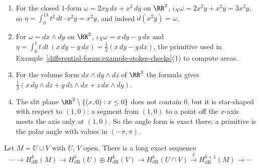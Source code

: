 \begin{example}\label{de-rham:example-explicit-primitives}
\begin{enumerate}
\item For the closed $1$-form $\omega = 2xy\,dx + x^2\,dy$ on $\RR^2$, $\iota_X\omega = 2x^2y + x^2y = 3x^2y$, so $\eta = \int_0^13t^2\,dt \cdot x^2y = x^2y$, and indeed $d(x^2y) = \omega$.
\item For $\omega = dx \wedge dy$ on $\RR^2$, $\iota_X\omega = x\,dy - y\,dx$ and $\eta = \int_0^1t\,dt\,(x\,dy - y\,dx) = \frac12(x\,dy - y\,dx)$, the primitive used in
Example~\ref{differential-forms:example-stokes-checks}(1) to compute areas.
\item For the volume form $dx \wedge dy \wedge dz$ of $\RR^3$ the formula gives $\frac13(x\,dy \wedge dz + y\,dz \wedge dx + z\,dx \wedge dy)$.
\item The slit plane $\RR^2 \setminus \{(x, 0) : x \leq 0\}$ does not contain $0$, but it is star-shaped with respect to $(1, 0)$: a segment from $(1, 0)$ to a point off the
$x$-axis meets the axis only at $(1, 0)$. So the angle form is exact there; a primitive is the polar angle with values in $(-\pi, \pi)$.
\end{enumerate}
\end{example}

\begin{theorem}\label{de-rham:theorem-mayer-vietoris}
Let $M = U \cup V$ with $U$, $V$ open. There is a long exact sequence
\[
\cdots \to H^k_{\mathrm{dR}}(M) \to H^k_{\mathrm{dR}}(U) \oplus H^k_{\mathrm{dR}}(V) \to H^k_{\mathrm{dR}}(U \cap V) \xrightarrow{\ \delta\ } H^{k+1}_{\mathrm{dR}}(M) \to \cdots
\]
\end{theorem}

